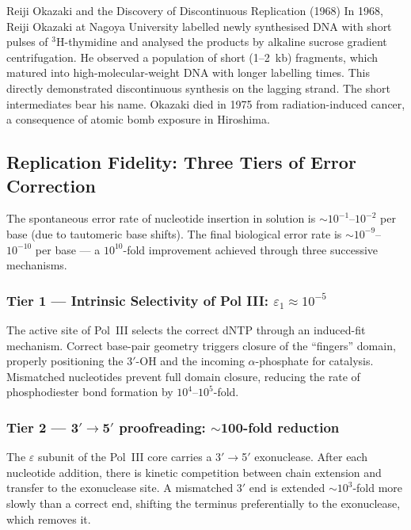 \documentclass[12pt, a4paper, oneside]{report}
\begin{document}
\begin{historicalnote}{Reiji Okazaki and the Discovery of Discontinuous Replication (1968)}
  In 1968, Reiji Okazaki at Nagoya University labelled newly synthesised
  DNA with short pulses of $^3$H-thymidine and analysed the products by
  alkaline sucrose gradient centrifugation. He observed a population of
  short (1--2~kb) fragments, which matured into high-molecular-weight DNA
  with longer labelling times. This directly demonstrated discontinuous
  synthesis on the lagging strand. The short intermediates bear his name.
  Okazaki died in 1975 from radiation-induced cancer, a consequence of
  atomic bomb exposure in Hiroshima.
\end{historicalnote}

\subsection{Replication Fidelity: Three Tiers of Error Correction}

The spontaneous error rate of nucleotide insertion in solution is
$\sim10^{-1}$--$10^{-2}$ per base (due to tautomeric base shifts). The
final biological error rate is $\sim10^{-9}$--$10^{-10}$ per base — a
$10^{10}$-fold improvement achieved through three successive mechanisms.

\subsubsection*{Tier 1 — Intrinsic Selectivity of Pol III: $\varepsilon_1 \approx 10^{-5}$}

The active site of Pol~III selects the correct dNTP through an
induced-fit mechanism. Correct base-pair geometry triggers closure of
the ``fingers'' domain, properly positioning the 3$'$-OH and the
incoming $\alpha$-phosphate for catalysis. Mismatched nucleotides
prevent full domain closure, reducing the rate of phosphodiester bond
formation by $10^4$--$10^5$-fold.

\subsubsection*{Tier 2 — 3$'\to$5$'$ proofreading: $\sim$100-fold reduction}

The $\varepsilon$ subunit of the Pol~III core carries a 3$'\to$5$'$
exonuclease. After each nucleotide addition, there is kinetic competition
between chain extension and transfer to the exonuclease site. A mismatched
3$'$ end is extended $\sim10^3$-fold more slowly than a correct end,
shifting the terminus preferentially to the exonuclease, which removes it.
\end{document}
